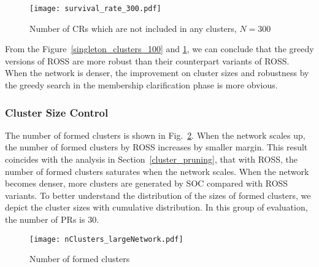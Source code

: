   \begin{figure}[!h]
    \centering
   \texttt{[image: survival\_rate\_300.pdf]}
  \caption{Number of CRs which are not included in any clusters, $N=300$}
  \label{singleton_clusters_300}
\end{figure}

From the Figure~\ref{singleton_clusters_100} and \ref{singleton_clusters_300}, we can conclude that the greedy versions of ROSS are more robust than their counterpart variants of ROSS.
When the network is denser, the improvement on cluster sizes and robustness by the greedy search in the membership clarification phase is more obvious.


\subsubsection{Cluster Size Control}

The number of formed clusters is shown in Fig.~\ref{nClusters_largeNetwork}.
When the network scales up, the number of formed clusters by ROSS increases by smaller margin.
This result coincides with the analysis in Section~\ref{cluster_pruning}, that with ROSS, the number of formed clusters saturates when the network scales.
When the network becomes denser, more clusters are generated by SOC compared with ROSS variants.
To better understand the distribution of the sizes of formed clusters, we depict the cluster sizes with cumulative distribution.
In this group of evaluation, the number of PRs is 30.

\begin{figure}[!h]
  \centering
   \texttt{[image: nClusters\_largeNetwork.pdf]}
  \caption{Number of formed clusters}
  \label{nClusters_largeNetwork}
\end{figure}






